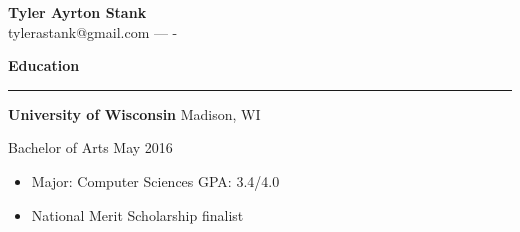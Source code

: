 \documentclass[12pt,letterpaper]{article}
\newenvironment{details}{
    \vspace{-.8em}
    \begin{itemize}
        \renewcommand \labelitemi{\labelitemiv}
        \setlength{\itemsep}{0pt}
        \setlength{\parskip}{-1pt}
        \setlength{\parsep}{0pt}
    }{
    \end{itemize}
    \vspace{-.5em}
}
\newcommand{\hr} {
    \vspace{-1em}
    \par\rule{\textwidth}{1pt}
    \vspace{-1.5em}
}
\newcommand{\ressection}[1] {
    \par{\large \textbf{#1}}
    \hr
}
\newenvironment{education} {
    \ressection{Education}
}{
    \vspace{0.5em}
}
\newcommand{\educator}[4] {
    \textbf{#1}
    \hfill #2
    \par #3 \hfill #4
    \par%
}
\begin{document}
\thispagestyle{empty}

\begin{centering}
    {\huge \textbf{Tyler Ayrton Stank}}\\
    tylerastank@gmail.com ---  -\\
\end{centering}

\begin{education}

\educator{University of Wisconsin}{Madison, WI}{Bachelor of Arts}{May 2016}
\begin{details}
    \item Major: Computer Sciences \hfill GPA: 3.4/4.0
    \item National Merit Scholarship finalist
\end{details}

\end{education}
\end{document}
